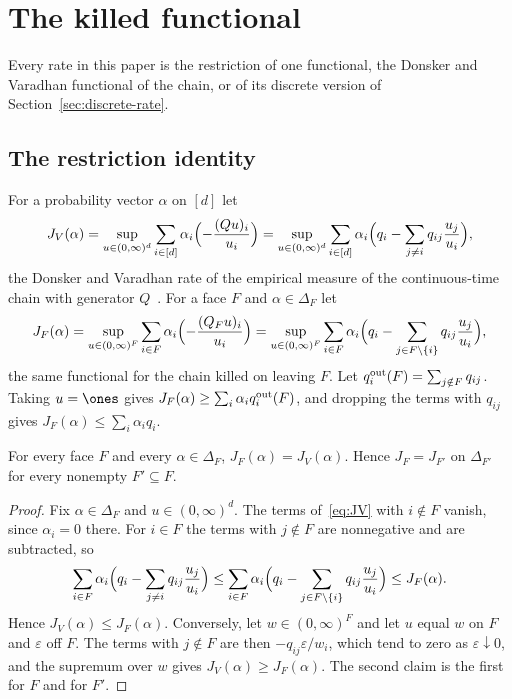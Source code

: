 \section{The killed functional}\label{sec:dv}

Every rate in this paper is the restriction of one functional, the Donsker and
Varadhan functional of the chain, or of its discrete version of
Section~\ref{sec:discrete-rate}.

\subsection{The restriction identity}\label{sec:restriction}

For a probability vector $\alpha$ on $[d]$ let
\begin{equation}\label{eq:JV}
 J_V(\alpha)=\sup_{u\in(0,\infty)^d}\sum_{i\in[d]}\alpha_i\Bigl(-\frac{(Qu)_i}{u_i}\Bigr)
 =\sup_{u\in(0,\infty)^d}\sum_{i\in[d]}\alpha_i\Bigl(q_i-\sum_{j\ne i}q_{ij}\frac{u_j}{u_i}\Bigr),
\end{equation}
the Donsker and Varadhan rate of the empirical measure of the continuous-time
chain with generator $Q$~\cite{dv1975}. For a face $F$ and $\alpha\in\Delta_F$ let
\[
 J_F(\alpha)=\sup_{u\in(0,\infty)^F}\sum_{i\in F}\alpha_i\Bigl(-\frac{(Q_Fu)_i}{u_i}\Bigr)
 =\sup_{u\in(0,\infty)^F}\sum_{i\in F}\alpha_i\Bigl(q_i-\sum_{j\in F\setminus\{i\}}q_{ij}\frac{u_j}{u_i}\Bigr),
\]
the same functional for the chain killed on leaving $F$. Let $q_i^{\rm out}(F)=\sum_{j\notin F}q_{ij}$. Taking $u=\ones$
gives $J_F(\alpha)\ge\sum_i\alpha_iq_i^{\rm out}(F)$, and dropping the terms
with $q_{ij}$ gives $J_F(\alpha)\le\sum_i\alpha_iq_i$.

\begin{proposition}\label{prop:restriction}
For every face $F$ and every $\alpha\in\Delta_F$, $J_F(\alpha)=J_V(\alpha)$. Hence
$J_F=J_{F'}$ on $\Delta_{F'}$ for every nonempty $F'\subseteq F$.
\end{proposition}

\begin{proof}
Fix $\alpha\in\Delta_F$ and $u\in(0,\infty)^d$. The terms of~\eqref{eq:JV} with
$i\notin F$ vanish, since $\alpha_i=0$ there. For $i\in F$ the terms with
$j\notin F$ are nonnegative and are subtracted, so
\[
 \sum_{i\in F}\alpha_i\Bigl(q_i-\sum_{j\ne i}q_{ij}\frac{u_j}{u_i}\Bigr)
 \le\sum_{i\in F}\alpha_i\Bigl(q_i-\sum_{j\in F\setminus\{i\}}q_{ij}\frac{u_j}{u_i}\Bigr)
 \le J_F(\alpha).
\]
Hence $J_V(\alpha)\le J_F(\alpha)$. Conversely, let $w\in(0,\infty)^F$ and let $u$
equal $w$ on $F$ and $\varepsilon$ off $F$. The terms with $j\notin F$ are then
$-q_{ij}\varepsilon/w_i$, which tend to zero as $\varepsilon\downarrow0$, and
the supremum over $w$ gives $J_V(\alpha)\ge J_F(\alpha)$. The second claim is the
first for $F$ and for $F'$.
\end{proof}

